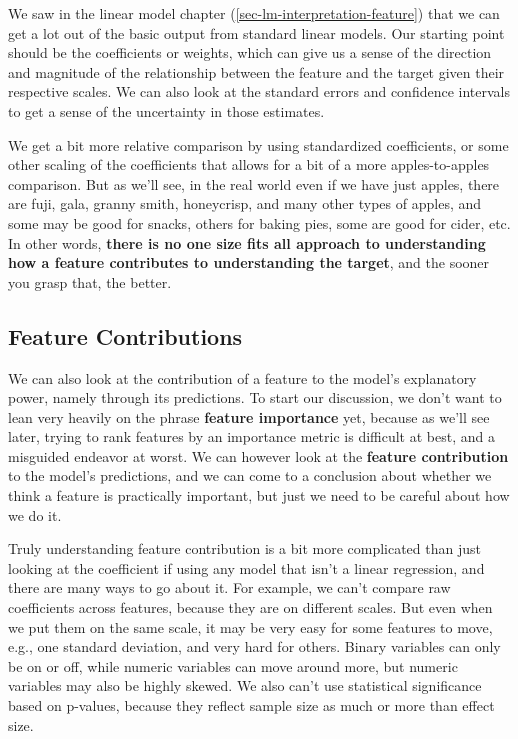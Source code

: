 \documentclass[
  letterpaper,
]{krantz}
\begin{document}
We saw in the linear model chapter (\ref{sec-lm-interpretation-feature})
that we can get a lot out of the basic output from standard linear
models. Our starting point should be the coefficients or weights, which
can give us a sense of the direction and magnitude of the relationship
between the feature and the target given their respective scales. We can
also look at the standard errors and confidence intervals to get a sense
of the uncertainty in those estimates.

We get a bit more relative comparison by using standardized
coefficients, or some other scaling of the coefficients that allows for
a bit of a more apples-to-apples comparison. But as we'll see, in the
real world even if we have just apples, there are fuji, gala, granny
smith, honeycrisp, and many other types of apples, and some may be good
for snacks, others for baking pies, some are good for cider, etc. In
other words, \textbf{there is no one size fits all approach to
understanding how a feature contributes to understanding the target},
and the sooner you grasp that, the better.

\subsection{Feature Contributions}\label{feature-contributions}

We can also look at the contribution of a feature to the model's
explanatory power, namely through its predictions. To start our
discussion, we don't want to lean very heavily on the phrase
\textbf{feature importance} yet, because as we'll see later, trying to
rank features by an importance metric is difficult at best, and a
misguided endeavor at worst. We can however look at the \textbf{feature
contribution} to the model's predictions, and we can come to a
conclusion about whether we think a feature is practically important,
but just we need to be careful about how we do it.

Truly understanding feature contribution is a bit more complicated than
just looking at the coefficient if using any model that isn't a linear
regression, and there are many ways to go about it. For example, we
can't compare raw coefficients across features, because they are on
different scales. But even when we put them on the same scale, it may be
very easy for some features to move, e.g., one standard deviation, and
very hard for others. Binary variables can only be on or off, while
numeric variables can move around more, but numeric variables may also
be highly skewed. We also can't use statistical significance based on
p-values, because they reflect sample size as much or more than effect
size.
\end{document}
